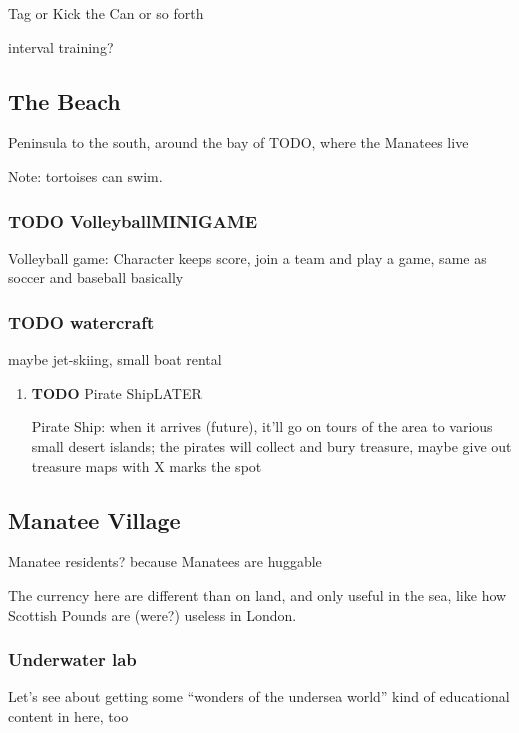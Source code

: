 \documentclass[11pt]{article}
\begin{document}
\begin{enumerate}
\begin{enumerate}
Tag or Kick the Can or so forth

interval training?
\end{enumerate}
\subsection{The Beach}
\label{sec-4-2}

Peninsula to the south, around the bay of TODO, where the Manatees live

Note: tortoises can swim.

\subsubsection{{\bfseries\sffamily TODO} Volleyball\hfill{}\textsc{MINIGAME}}
\label{sec-4-2-1}

Volleyball game: Character  keeps score, join a team and  play a game,
same as soccer and baseball basically
\subsubsection{{\bfseries\sffamily TODO} watercraft}
\label{sec-4-2-2}

maybe jet-skiing, small boat rental

\begin{enumerate}
\item {\bfseries\sffamily TODO} Pirate Ship\hfill{}\textsc{LATER}
\label{sec-4-2-2-1}

Pirate Ship: when it arrives (future), it'll go on tours of the area
to various small desert islands; the pirates will collect and bury
treasure, maybe give out treasure maps with X marks the spot
\end{enumerate}
\subsection{Manatee Village}
\label{sec-4-3}

Manatee residents?  because  Manatees are huggable

The currency here are different than on land, and only useful in the
sea, like how Scottish Pounds are (were?) useless in London.

\subsubsection{Underwater lab}
\label{sec-4-3-1}

Let's see about  getting some “wonders of the undersea  world” kind of
educational content in here, too


\end{enumerate}
\end{document}

